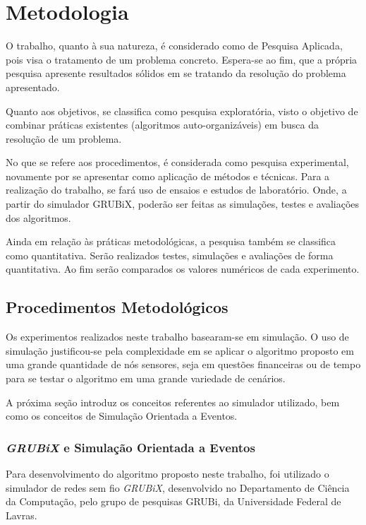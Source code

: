 \newpage\section{Metodologia}
\label{chap:Metodologia}


O trabalho, quanto à sua natureza, é considerado como de Pesquisa Aplicada, pois visa o tratamento de um problema concreto. Espera-se ao fim, que a própria pesquisa apresente resultados sólidos em se tratando da resolução do problema apresentado.

Quanto aos objetivos, se classifica como pesquisa exploratória, visto o objetivo de combinar práticas existentes (algoritmos auto-organizáveis) em busca da resolução de um problema.

No que se refere aos procedimentos, é considerada como pesquisa experimental, novamente por se apresentar como aplicação de métodos e técnicas. Para a realização do trabalho, se fará uso de ensaios e estudos de laboratório. Onde, a partir do simulador GRUBiX, poderão ser feitas as simulações, testes e avaliações dos algoritmos.
              
Ainda em relação às práticas metodológicas, a pesquisa também se classifica como quantitativa. Serão realizados testes, simulações e avaliações de forma quantitativa. Ao fim serão comparados os valores numéricos de cada experimento.

\subsection{Procedimentos Metodológicos}

Os experimentos realizados neste trabalho basearam-se em simulação. O uso de simulação justificou-se pela complexidade em se aplicar o algoritmo proposto em uma grande quantidade de nós sensores, seja em questões financeiras ou de tempo para se testar o algoritmo em uma grande variedade de cenários.

A próxima seção introduz os conceitos referentes ao simulador utilizado, bem como os conceitos de Simulação Orientada a Eventos.

\subsubsection{\emph{GRUBiX} e Simulação Orientada a Eventos}
Para desenvolvimento do algoritmo proposto neste trabalho, foi utilizado o simulador de redes sem fio \emph{GRUBiX}, desenvolvido no Departamento de Ciência da Computação, pelo grupo de pesquisas GRUBi, da Universidade Federal de Lavras.


